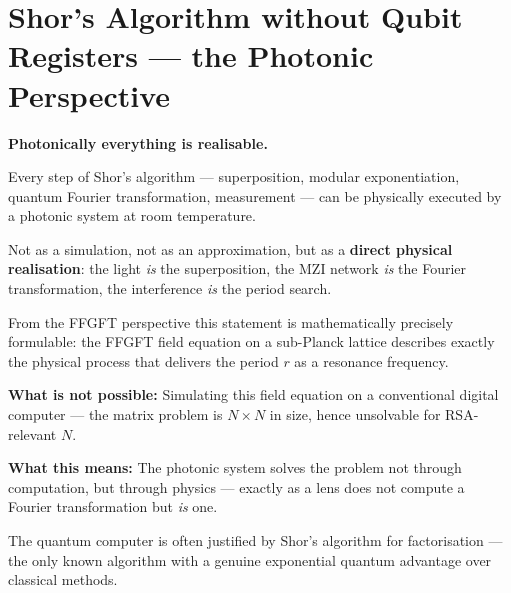 
\providecommand{\ket}[1]{\left|#1\right\rangle}
\providecommand{\bra}[1]{\left\langle#1\right|}
\providecommand{\braket}[2]{\left\langle#1\middle|#2\right\rangle}

\section{Shor's Algorithm without Qubit Registers ---
  the Photonic Perspective}
\label{sec:shor-photon}

\begin{significance}
\textbf{Photonically everything is realisable.}

Every step of Shor's algorithm ---
superposition, modular exponentiation,
quantum Fourier transformation, measurement ---
can be physically executed by a photonic system at
room temperature.

Not as a simulation, not as an approximation,
but as a \textbf{direct physical realisation}:
the light \emph{is} the superposition,
the MZI network \emph{is} the Fourier transformation,
the interference \emph{is} the period search.

From the FFGFT perspective this statement is mathematically
precisely formulable:
the FFGFT field equation on a sub-Planck lattice
describes exactly the physical process
that delivers the period $r$ as a resonance frequency.

\medskip
\textbf{What is not possible:}
Simulating this field equation on a conventional
digital computer ---
the matrix problem is $N \times N$ in size,
hence unsolvable for RSA-relevant $N$.

\medskip
\textbf{What this means:}
The photonic system solves the problem
not through computation, but through physics ---
exactly as a lens does not compute a Fourier transformation
but \emph{is} one.
\end{significance}

The quantum computer is often justified by Shor's algorithm
for factorisation --- the only known algorithm with a genuine
exponential quantum advantage over classical methods.

